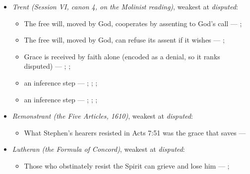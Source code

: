\documentclass[11pt]{article}
\begin{document}
\begin{itemize}
\begin{itemize}
\item Grace is received by faith alone --- \cite[Augsburg Confession IV.1–3]{concordia-triglotta-1921}; \cite[Sermon 1, III.1]{wesley-sermons-1872}; \cite[Trent, Session VI (1547), canon 9]{tanner-decrees-1990}
\end{itemize}
\item \emph{Trent (Session VI, canon 4, on the Molinist reading)}, weakest at \emph{disputed}:
\begin{itemize}
\item The free will, moved by God, cooperates by assenting to God’s call --- \cite[Trent, Session VI (1547), canon 4]{tanner-decrees-1990}; \cite[45]{waterworth-trent-1848}
\item The free will, moved by God, can refuse its assent if it wishes --- \cite[Trent, Session VI (1547), canon 4]{tanner-decrees-1990}; \cite[45]{waterworth-trent-1848}
\item Grace is received by faith alone (encoded as a denial, so it ranks disputed) --- \cite[Augsburg Confession IV.1–3]{concordia-triglotta-1921}; \cite[Sermon 1, III.1]{wesley-sermons-1872}; \cite[Trent, Session VI (1547), canon 9]{tanner-decrees-1990}
\item an inference step --- \cite[I-II q.111 a.2]{aquinas-summa-1920}; \cite[Canons of Dort, III/IV, art. 12]{schaff-creeds-christendom-3-1977}; \cite[Trent, Session VI (1547), canon 4]{tanner-decrees-1990}; \cite[45]{waterworth-trent-1848}
\item an inference step --- \cite[I-II q.10 a.4 ad 3]{aquinas-summa-1920}; \cite[I-II q.112 a.3]{aquinas-summa-1920}; \cite[Trent, Session VI (1547), canon 4]{tanner-decrees-1990}; \cite[45]{waterworth-trent-1848}
\end{itemize}
\item \emph{Remonstrant (the Five Articles, 1610)}, weakest at \emph{disputed}:
\begin{itemize}
\item What Stephen’s hearers resisted in Acts 7:51 was the grace that saves --- \cite[Five Arminian Articles (1610), art. 4]{schaff-creeds-christendom-3-1977}
\end{itemize}
\item \emph{Lutheran (the Formula of Concord)}, weakest at \emph{disputed}:
\begin{itemize}
\item Those who obstinately resist the Spirit can grieve and lose him --- \cite[Solid Declaration II.83]{concordia-triglotta-1921}; \cite[Solid Declaration XI.42]{concordia-triglotta-1921}

\end{itemize}
\end{itemize}
\end{document}

